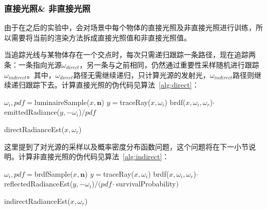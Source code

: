 \subsubsection {直接光照\& 非直接光照}
由于在之后的实验中，会对场景中每个物体的直接光照及非直接光照进行训练，所以需要将当前的渲染方法拆成直接光照值和非直接光照值。

当追踪光线与某物体存在一个交点时，每次只需递归跟踪一条路径，现在追踪两条：一条指向光源$\omega_{direct}$，另一条与之前相同，仍然通过重要性采样随机进行跟踪$\omega_{indirect}$。其中，$\omega_{direct}$路径无需继续递归，只计算光源的发射光，$\omega_{indirect}$路径则继续递归跟踪下去。计算直接光照的伪代码见算法~\ref{alg:direct}：
\begin{algorithm}
\begin{algorithmic}
    \STATE $\omega_{i},pdf=$luminaireSample($x,\bm{n}$)
    \STATE $y=$traceRay($x,\omega_{i}$)
    \RETURN brdf($x,\omega_{i},\omega_{r}$)$\cdot$emittedRadiance($y,-\omega_{i}$)$/pdf$
\end{algorithmic}
\caption{directRadianceEst($x,\omega_{r}$)}
\label{alg:direct}
\end{algorithm}
这里提到了对光源的采样以及概率密度分布函数问题，这个问题将在下一小节说明。计算非直接光照的伪代码见算法~\ref{alg:indirect}：
\begin{algorithm}[h]
\begin{algorithmic}
        \STATE $\omega_{i},pdf=$brdfSample($x,\bm{n}$)
        \STATE $y=$traceRay($x,\omega_{i}$)
        \RETURN brdf($x,\omega_{i},\omega_{r}$)$\cdot$reflectedRadianceEst($y,-\omega_{i}$)$/(pdf\cdot$survivalProbability$)$
    \ELSE
    \ENDIF
\end{algorithmic}
\caption{indirectRadianceEst($x,\omega_{r}$)}
\label{alg:indirect}
\end{algorithm}

